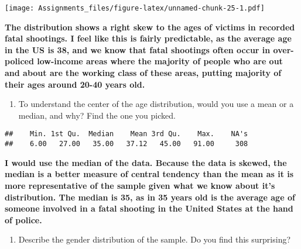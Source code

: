 \documentclass[
]{article}
\newenvironment{Shaded}{\begin{snugshade}}{\end{snugshade}}
\newcommand{\FunctionTok}[1]{\textcolor[rgb]{0.00,0.00,0.00}{#1}}
\newcommand{\NormalTok}[1]{#1}
\newcommand{\SpecialCharTok}[1]{\textcolor[rgb]{0.00,0.00,0.00}{#1}}
\providecommand{\tightlist}{%
  \setlength{\itemsep}{0pt}\setlength{\parskip}{0pt}}
\begin{document}
\begin{Shaded}
\end{Shaded}

\texttt{[image: Assignments\_files/figure-latex/unnamed-chunk-25-1.pdf]}

\textbf{The distribution shows a right skew to the ages of victims in
recorded fatal shootings. I feel like this is fairly predictable, as the
average age in the US is 38, and we know that fatal shootings often
occur in over-policed low-income areas where the majority of people who
are out and about are the working class of these areas, putting majority
of their ages around 20-40 years old.}

\begin{enumerate}
\def\labelenumi{\alph{enumi}.}
\setcounter{enumi}{1}
\tightlist
\item
  To understand the center of the age distribution, would you use a mean
  or a median, and why? Find the one you picked.
\end{enumerate}

\begin{Shaded}
\end{Shaded}

\begin{verbatim}
##    Min. 1st Qu.  Median    Mean 3rd Qu.    Max.    NA's 
##    6.00   27.00   35.00   37.12   45.00   91.00     308
\end{verbatim}

\textbf{I would use the median of the data. Because the data is skewed,
the median is a better measure of central tendency than the mean as it
is more representative of the sample given what we know about it's
distribution. The median is 35, as in 35 years old is the average age of
someone involved in a fatal shooting in the United States at the hand of
police.}

\begin{enumerate}
\def\labelenumi{\alph{enumi}.}
\setcounter{enumi}{2}
\tightlist
\item
  Describe the gender distribution of the sample. Do you find this
  surprising?
\end{enumerate}
\end{document}
